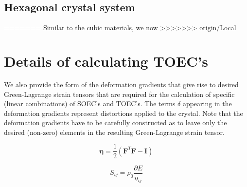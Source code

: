 \documentclass[showpacs,aps,floatfix,prb,reprint,superscriptaddress,onecolumn]{revtex4-1}
\begin{document}
\begin{enumerate}
\subsection{Hexagonal crystal system}

=======
Similar to the cubic materials, we now 
>>>>>>> origin/Local


\section{Details of calculating TOEC's}

We also provide the form of the deformation gradients that give rise to desired Green-Lagrange strain tensors that are required for the calculation of specific (linear combinations) of SOEC's and TOEC's. The terms $\delta$ appearing in the deformation gradients represent distortions applied to the crystal. Note that the deformation gradients have to be carefully constructed as to leave only the desired (non-zero) elements in the resulting Green-Lagrange strain tensor.

\begin{equation}
\label{eqn:SM-GL1} 
\bm{\eta} = \frac{1}{2} \left(\bm{F}^{T} \bm{F} - \bm{I} \right)
\end{equation}

\begin{equation}
\label{eqn:SM-stressexpansion1} 
S_{ij} = \rho_{0} \frac{\partial E}{\eta_{ij}}
\end{equation}


\end{enumerate}
\end{document}
